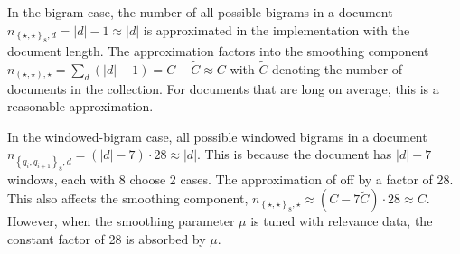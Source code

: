 \documentclass[]{article}
\begin{document}
In the bigram case, the number of all possible bigrams in a document
$n_{\left\{ \star,\star\right\} _{8},d}=|d|-1\approx|d|$ is approximated in
the implementation with the document length.
The approximation factors into the smoothing component $n_{\left(\star,\star\right),\star}=\sum_{d}\left(|d|-1\right)=C-\tilde{C}\approx C$
with $\tilde{C}$ denoting the number of documents in the collection.
For documents that are long on average, this is a reasonable approximation.

In the windowed-bigram case, all possible windowed bigrams
in a document $n_{\left\{ q_{i},q_{i+1}\right\} _{8},d}=\left(|d|-7\right)\cdot 28\approx|d|$. This is 
because the document has $|d|-7$ windows, each with 8 choose 2 cases. The approximation of off by a factor of 28. This also affects the smoothing component, $n_{\left\{ \star,\star\right\} _{8},\star}\approx\left(C-7\tilde{C}\right)\cdot 28\approx C$. However, when the smoothing parameter $\mu$ is tuned with relevance data, the constant factor of 28 is
absorbed by $\mu$.
\end{document}
